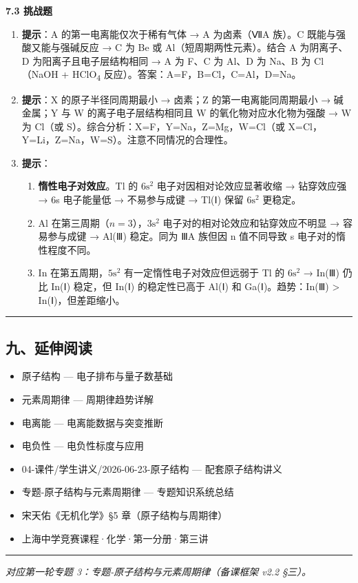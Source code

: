 \documentclass[a4paper,11pt]{ctexart}
\providecommand{\tightlist}{\setlength{\itemsep}{0pt}\setlength{\parskip}{0pt}}
\begin{document}
\textbf{7.3 挑战题}

\begin{enumerate}
\def\labelenumi{\arabic{enumi}.}
\setcounter{enumi}{6}
\item
  \textbf{提示}：A 的第一电离能仅次于稀有气体 → A 为卤素（ⅦA 族）。C 既能与强酸又能与强碱反应 → C 为 Be 或 Al（短周期两性元素）。结合 A 为阴离子、D 为阳离子且电子层结构相同 → A 为 F、C 为 Al、D 为 Na、B 为 Cl（NaOH + HClO\textsubscript{4} 反应）。答案：A=F，B=Cl，C=Al，D=Na。
\item
  \textbf{提示}：X 的原子半径同周期最小 → 卤素；Z 的第一电离能同周期最小 → 碱金属；Y 与 W 的离子电子层结构相同且 W 的氧化物对应水化物为强酸 → W 为 Cl（或 S）。综合分析：X=F，Y=Na，Z=Mg，W=Cl（或 X=Cl，Y=Li，Z=Na，W=S）。注意不同情况的合理性。
\item
  \textbf{提示}：

  \begin{enumerate}
  \def\labelenumii{(\arabic{enumii})}
  \tightlist
  \item
    \textbf{惰性电子对效应}。Tl 的 \(6\mathrm{s}^2\) 电子对因相对论效应显著收缩 → 钻穿效应强 → 6s 电子能量低 → 不易参与成键 → Tl(Ⅰ) 保留 \(6\mathrm{s}^2\) 更稳定。
  \item
    Al 在第三周期（\(n=3\)），\(3\mathrm{s}^2\) 电子对的相对论效应和钻穿效应不明显 → 容易参与成键 → Al(Ⅲ) 稳定。同为 ⅢA 族但因 n 值不同导致 s 电子对的惰性程度不同。
  \item
    In 在第五周期，\(5\mathrm{s}^2\) 有一定惰性电子对效应但远弱于 Tl 的 \(6\mathrm{s}^2\) → In(Ⅲ) 仍比 In(Ⅰ) 稳定，但 In(Ⅰ) 的稳定性已高于 Al(Ⅰ) 和 Ga(Ⅰ)。趋势：In(Ⅲ) \textgreater{} In(Ⅰ)，但差距缩小。
  \end{enumerate}
\end{enumerate}

\begin{center}\rule{0.5\linewidth}{0.5pt}\end{center}

\subsection{九、延伸阅读}\label{ux4e5dux5ef6ux4f38ux9605ux8bfb}

\begin{itemize}
\tightlist
\item
  原子结构 --- 电子排布与量子数基础
\item
  元素周期律 --- 周期律趋势详解
\item
  电离能 --- 电离能数据与突变推断
\item
  电负性 --- 电负性标度与应用
\item
  04-课件/学生讲义/2026-06-23-原子结构 --- 配套原子结构讲义
\item
  专题-原子结构与元素周期律 --- 专题知识系统总结
\item
  宋天佑《无机化学》§5 章（原子结构与周期律）
\item
  上海中学竞赛课程·化学·第一分册·第三讲
\end{itemize}

\begin{center}\rule{0.5\linewidth}{0.5pt}\end{center}

\emph{对应第一轮专题 3：专题-原子结构与元素周期律（备课框架 v2.2 §三）。}
\end{document}
